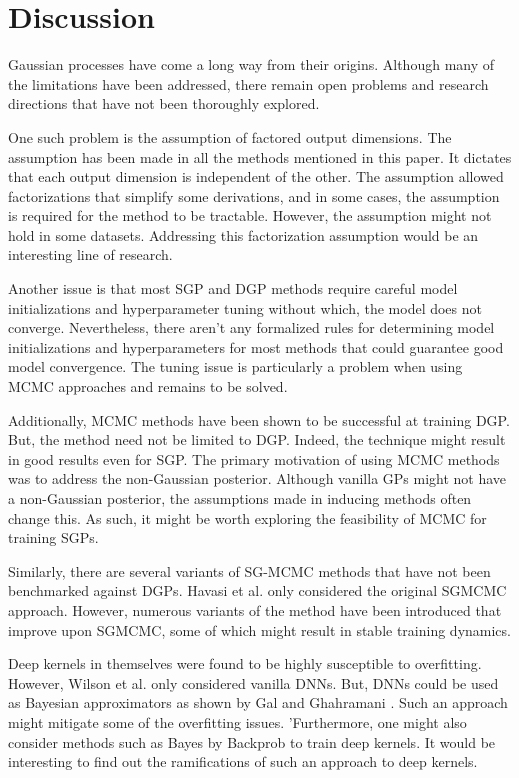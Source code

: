 \documentclass[letterpaper,11pt]{extarticle}
\begin{document}
\section{Discussion}
Gaussian processes have come a long way from their origins. Although many of the limitations have been addressed, there remain open problems and research directions that have not been thoroughly explored. 

One such problem is the assumption of factored output dimensions. The assumption has been made in all the methods mentioned in this paper.  It dictates that each output dimension is independent of the other. The assumption allowed factorizations that simplify some derivations, and in some cases, the assumption is required for the method to be tractable. However, the assumption might not hold in some datasets. Addressing this factorization assumption would be an interesting line of research. 

Another issue is that most SGP and DGP methods require careful model initializations and hyperparameter tuning without which, the model does not converge. Nevertheless, there aren't any formalized rules for determining model initializations and hyperparameters for most methods that could guarantee good model convergence. The tuning issue is particularly a problem when using MCMC approaches and remains to be solved. 

Additionally, MCMC methods have been shown to be successful at training DGP. But, the method need not be limited to DGP. Indeed, the technique might result in good results even for SGP. The primary motivation of using MCMC methods was to address the non-Gaussian posterior. Although vanilla GPs might not have a non-Gaussian posterior, the assumptions made in inducing methods often change this. As such, it might be worth exploring the feasibility of MCMC for training SGPs.  

Similarly, there are several variants of SG-MCMC methods that have not been benchmarked against DGPs. Havasi et al. \cite{HavasiLF18} only considered the original SGMCMC \cite{ChenFG14}  approach. However, numerous variants of the method have been introduced that improve upon SGMCMC, some of which might result in stable training dynamics.

Deep kernels in themselves were found to be highly susceptible to overfitting. However, Wilson et al. \cite{WilsonHSX16} only considered vanilla DNNs. But, DNNs could be used as Bayesian approximators as shown by Gal and Ghahramani \cite{GalG16}. Such an approach might mitigate some of the overfitting issues. 'Furthermore, one might also consider methods such as Bayes by Backprob \cite{BlundellCKW15} to train deep kernels. It would be interesting to find out the ramifications of such an approach to deep kernels. 
\end{document}
